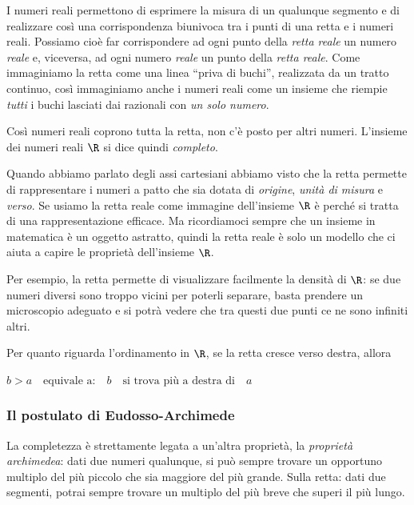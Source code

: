 I numeri reali 
permettono di esprimere la misura di un qualunque segmento e di realizzare così 
una corrispondenza biunivoca tra i punti di una retta e i numeri reali. 
Possiamo cioè far corrispondere ad ogni punto della \emph{retta reale} un 
numero \emph{reale} e, viceversa, ad ogni numero \emph{reale} un punto della 
\emph{retta reale}. 
Come immaginiamo la retta come una linea ``priva di buchi'', realizzata da un 
tratto continuo,
così immaginiamo anche i numeri reali come un insieme che riempie \emph{tutti} i 
buchi lasciati dai razionali con \emph{un solo numero}. 

Così numeri reali coprono tutta la retta, non c'è posto per altri numeri.
L'insieme dei numeri reali \(\R\) si dice quindi \emph{completo}.

Quando abbiamo parlato degli assi cartesiani abbiamo visto che la retta 
permette di rappresentare i numeri a patto che sia dotata di \emph{origine}, 
\emph{unità di misura} e \emph{verso}.
Se usiamo la retta reale come immagine dell'insieme \(\R\) è perché si tratta di 
una rappresentazione efficace. Ma ricordiamoci sempre che un insieme in 
matematica è un oggetto astratto, quindi la retta reale è solo un modello che ci 
aiuta a capire le proprietà dell'insieme \(\R\).

Per esempio, la retta permette di visualizzare facilmente la densità di \(\R\): 
se due numeri diversi sono troppo vicini per poterli separare, basta prendere un 
microscopio adeguato e si potrà vedere che tra questi due punti ce ne sono 
infiniti altri.

Per quanto riguarda l'ordinamento in \(\R\), se la retta cresce verso destra, 
allora 
\begin{center} 
\(b > a \quad \text{equivale a:} \quad 
b \quad \text{si trova più a destra di}\quad a\) 
\end{center}


\subsubsection{Il postulato di Eudosso-Archimede}

La completezza è strettamente legata a un'altra proprietà, la 
\emph{proprietà archimedea}: 
dati due numeri qualunque, si può sempre trovare un opportuno 
multiplo del più piccolo che sia maggiore del più grande. 
Sulla retta: dati due segmenti, potrai sempre trovare un multiplo del più breve 
che superi il più lungo.

